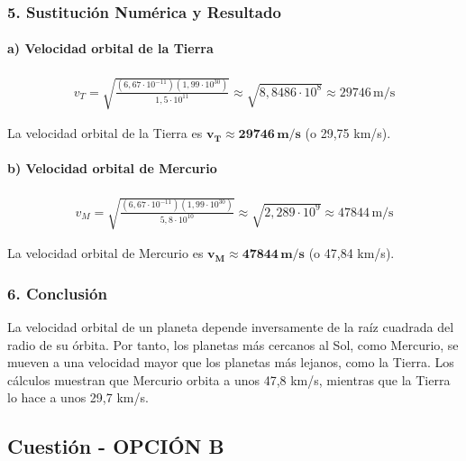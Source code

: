 \subsubsection*{5. Sustitución Numérica y Resultado}
\paragraph{a) Velocidad orbital de la Tierra}
\begin{gather}
    v_T = \sqrt{\frac{(6,67 \cdot 10^{-11})(1,99 \cdot 10^{30})}{1,5 \cdot 10^{11}}} \approx \sqrt{8,8486 \cdot 10^8} \approx 29746 \, \text{m/s}
\end{gather}
\begin{cajaresultado}
    La velocidad orbital de la Tierra es $\boldsymbol{v_T \approx 29746 \, \textbf{m/s}}$ (o 29,75 km/s).
\end{cajaresultado}

\paragraph{b) Velocidad orbital de Mercurio}
\begin{gather}
    v_M = \sqrt{\frac{(6,67 \cdot 10^{-11})(1,99 \cdot 10^{30})}{5,8 \cdot 10^{10}}} \approx \sqrt{2,289 \cdot 10^9} \approx 47844 \, \text{m/s}
\end{gather}
\begin{cajaresultado}
    La velocidad orbital de Mercurio es $\boldsymbol{v_M \approx 47844 \, \textbf{m/s}}$ (o 47,84 km/s).
\end{cajaresultado}

\subsubsection*{6. Conclusión}
\begin{cajaconclusion}
La velocidad orbital de un planeta depende inversamente de la raíz cuadrada del radio de su órbita. Por tanto, los planetas más cercanos al Sol, como Mercurio, se mueven a una velocidad mayor que los planetas más lejanos, como la Tierra. Los cálculos muestran que Mercurio orbita a unos 47,8 km/s, mientras que la Tierra lo hace a unos 29,7 km/s.
\end{cajaconclusion}

\newpage

\subsection{Cuestión - OPCIÓN B}
\label{subsec:1B_2011_sep_ext}


